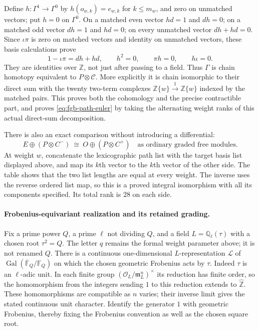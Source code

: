 Define $h:\Gamma^1\to\Gamma^0$ by
$h(o_{w,k})=e_{w,k}$ for $k\leq m_w$, and zero on unmatched vectors;
put $h=0$ on $\Gamma^0$. On a matched even vector $hd=1$ and $dh=0$;
on a matched odd vector $dh=1$ and $hd=0$; on every unmatched vector
$dh+hd=0$. Since $\iota\pi$ is zero on matched vectors and identity
on unmatched vectors, these basis calculations prove
\begin{equation}\label{eq:fgb-path-contraction}
 1-\iota\pi=dh+hd,\qquad
 h^2=0,\qquad \pi h=0,\qquad h\iota=0.
\end{equation}
They are identities over $\mathbb Z$, not just after passing to a field.
Thus $\Gamma$ is chain homotopy equivalent to $P\otimes\mathcal C$.
More explicitly it is chain isomorphic to their direct sum with the
twenty two-term complexes
$\mathbb Z\{w\}\xrightarrow{1}\mathbb Z\{w\}$ indexed by the
matched pairs. This proves both the cohomology and the precise
contractible part, and proves \eqref{eq:fgb-path-euler} by taking the
alternating weight ranks of this actual direct-sum decomposition.

There is also an exact comparison without introducing a differential:
\begin{equation}\label{eq:fgb-stable-isomorphism}
 E\oplus(P\otimes C^-)
 \ \cong\ O\oplus(P\otimes C^+)
 \quad\text{as ordinary graded free modules.}
\end{equation}
At weight $w$, concatenate the lexicographic path list with the target
basis list displayed above, and map its $k$th vector to the $k$th
vector of the other side. The table shows that the two list lengths
are equal at every weight. The inverse uses the reverse ordered list
map, so this is a proved integral isomorphism with all its components
specified. Its total rank is $28$ on each side.

\paragraph{Frobenius-equivariant realization and its retained grading.}
Fix a prime power $Q$, a prime $\ell$ not dividing $Q$, and a field
$L=\mathbb Q_\ell(\tau)$ with a chosen root $\tau^2=Q$. The letter
$q$ remains the formal weight parameter above; it is not renamed $Q$.
There is a continuous one-dimensional $L$-representation $\mathcal L$
of $\operatorname{Gal}(\overline{\mathbb F}_Q/\mathbb F_Q)$ on which
the chosen geometric Frobenius acts by $\tau$. Indeed $\tau$ is an
$\ell$-adic unit. In each finite group
$(\mathcal O_L/\mathfrak m_L^n)^\times$ its reduction has finite order,
so the homomorphism from the integers sending $1$ to this reduction
extends to $\widehat{\mathbb Z}$. These homomorphisms are compatible
as $n$ varies; their inverse limit gives the stated continuous unit
character. Identify the generator $1$ with geometric Frobenius, thereby
fixing the Frobenius convention as well as the chosen square root.

